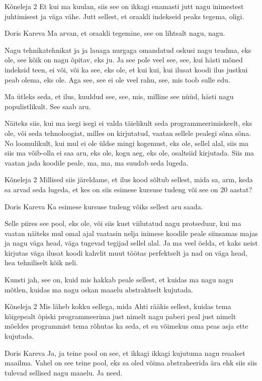 Kõneleja 2
Et kui ma kuulan, siis see on ikkagi enamasti jutt nagu inimestest juhtimisest ja väga vähe. Jutt sellest, et oraakli indekseid peaks tegema, oligi. 

Doris Kareva
Ma arvan, et oraakli tegemine, see on lihtsalt nagu, nagu. 

Nagu tehnikatehnikat ja ja lauaga nurgaga omandatud oskusi nagu teadma, eks ole, see kõik on nagu õpitav, eks ju. Ja see pole veel see, see, kui hästi mõned indeksid teen, ei või, või ka see, eks ole, et kui kui, kui ilusat koodi ilus justkui peab olema, eks ole. Aga see, see ei ole veel rahu, see, mis toob sulle edu. 

Ma ütleks seda, et ilus, kuuldud see, see, mis, milline see nüüd, hästi nagu populistlikult. See saab aru. 

Näiteks siis, kui ma isegi isegi ei valda täielikult seda programmeerimiskeelt, eks ole, või seda tehnoloogiat, milles on kirjutatud, vaatan sellele pealegi sõna sõna. No loomulikult, kui mul ei ole üldse mingi kogemust, eks ole, sellel alal, siis ma siis ma võib-olla ei saa aru, eks ole, kogu aeg, eks ole, osaltsiid kirjutada. Siis ma vaatan jada koodile peale, ma, ma, ma suudab seda lugeda. 

Kõneleja 2
Millised siis järeldame, et ilus kood sõltub sellest, mida sa, arm, keda sa arvad seda lugeda, et kes on siis esimese kursuse tudeng või see on 20 aastat? 

Doris Kareva
Ka esimese kursuse tudeng võiks sellest aru saada. 

Selle piires see pool, eks ole, või siis kust viilutatud nagu protseduur, kui ma vaatan näiteks mul omal ajal vaatasin nelja inimese koodile peale siinsamas majas ja nagu väga head, väga tugevad tegijad sellel alal. Ja ma veel öelda, et kaks neist kirjutas väga ilusat koodi kahvlit muut töötas perfektselt ja nad on väga head, hea tehniliselt kõik neli. 

Kunsti jah, see on, kuid mis hakkab peale sellest, et kuidas ma nagu nagu mõtlen, kuidas ma nagu oskan maaelu abstraktselt kujutada. 

Kõneleja 2
Mis läheb kokku sellega, mida Ahti rääkis sellest, kuidas tema kõigepealt õpiski programmeerima just nimelt nagu paberi peal just nimelt mõeldes programmist tema rõhutas ka seda, et su võimekus oma peas asja ette kujutada. 

Doris Kareva
Ja, ja teine pool on see, et ikkagi ikkagi kujutuma nagu reaalset maailma. Vahel on see teine pool, eks sa oled võima abstraheerida ära ehk siis siis tulevad sellised nagu maaelu. Ja need. 

